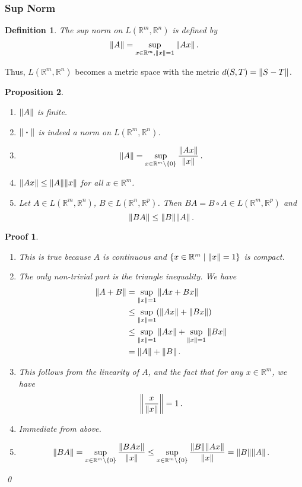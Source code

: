 \documentclass{article}
\theoremstyle{plain}\theoremheaderfont{\normalfont\itshape}\theorembodyfont{\rmfamily}\theoremseparator{.}\newtheorem*{rem}{Remark}\newtheorem*{ex}{Example}\newtheorem*{proof}{Proof}\newtheorem*{altp}{Alternative proof}
\theoremstyle{plain}\theoremheaderfont{\normalfont\bfseries}\theorembodyfont{\rmfamily}\theoremseparator{.}\newtheorem{thm}{Theorem}[section]\newtheorem{lem}[thm]{Lemma}\newtheorem{prop}[thm]{Proposition}\newtheorem*{cor}{Corollary}\newtheorem{defn}[thm]{Definition}\newtheorem{clm}[thm]{Claim}\newtheorem{clminproof}{Claim}
\theoremstyle{break}\theoremheaderfont{\normalfont\itshape}\theorembodyfont{\rmfamily}\theoremseparator{.\medskip}\newtheorem*{proofskip}{Proof}\newtheorem*{exs}{Examples}\newtheorem*{rems}{Remarks}
\theoremstyle{break}\theoremheaderfont{\normalfont\bfseries}\theorembodyfont{\rmfamily}\theoremseparator{.\medskip}\newtheorem{lemskip}[thm]{Lemma}\newtheorem{defnskip}[thm]{Definition}\newtheorem{propskip}[thm]{Proposition}\newtheorem{thmskip}[thm]{Theorem}
\newcommand{\qed}{\hfill\ensuremath{\Box}}
\begin{document}
    \subsubsection{Sup Norm}
    \begin{defn}
        The \textit{sup norm} on \(L(\mathbb{R}^m,\mathbb{R}^n)\) is defined by
        \[\norm{A}=\sup_{x\in\mathbb{R}^m,\norm{x}=1}\norm{Ax}\,.\]
    \end{defn}
    Thus, \(L(\mathbb{R}^m,\mathbb{R}^n)\) becomes a metric space with the metric \(d(S,T)=\norm{S-T}\).
    \begin{propskip}
        \begin{enumerate}[label=(\roman*),topsep=0pt]
            \item \(\norm{A}\) is finite.
            \item \(\norm{\;\vdot\;}\) is indeed a norm on \(L(\mathbb{R}^m,\mathbb{R}^n)\).
            \item
            \[\norm{A}=\sup_{x\in\mathbb{R}^m\setminus\{0\}}\frac{\norm{Ax}}{\norm{x}}\,.\]
            \item \(\norm{Ax}\le\norm{A}\norm{x}\) for all \(x\in\mathbb{R}^m\).
            \item Let \(A\in L(\mathbb{R}^m,\mathbb{R}^n)\), \(B\in L(\mathbb{R}^n,\mathbb{R}^p)\). Then \(BA=B\circ A\in L(\mathbb{R}^m,\mathbb{R}^p)\) and
            \[\norm{BA}\le\norm{B}\norm{A}\,.\]
        \end{enumerate}
    \end{propskip}
    \begin{proofskip}
        \begin{enumerate}[label=(\roman*),topsep=0pt]
            \item This is true because \(A\) is continuous and \(\{x\in\mathbb{R}^m\mid\norm{x}=1\}\) is compact.
            \item The only non-trivial part is the triangle inequality. We have
            \begin{align*}
                \norm{A+B}&=\sup_{\norm{x}=1}\norm{Ax+Bx}\\
                &\le\sup_{\norm{x}=1}(\norm{Ax}+\norm{Bx})\\
                &\le\sup_{\norm{x}=1}\norm{Ax}+\sup_{\norm{x}=1}\norm{Bx}\\
                &=\norm{A}+\norm{B}\,.
            \end{align*}
            \item This follows from the linearity of \(A\), and the fact that for any \(x\in\mathbb{R}^m\), we have
            \[\norm{\frac{x}{\norm{x}}}=1\,.\]
            \item Immediate from above.
            \item
            \[\norm{BA}=\sup_{x\in\mathbb{R}^m\setminus\{0\}}\frac{\norm{BAx}}{\norm{x}}\le\sup_{x\in\mathbb{R}^m\setminus\{0\}}\frac{\norm{B}\norm{Ax}}{\norm{x}}=\norm{B}\norm{A}\,.\]
        \end{enumerate}\qed
    \end{proofskip}
\end{document}
